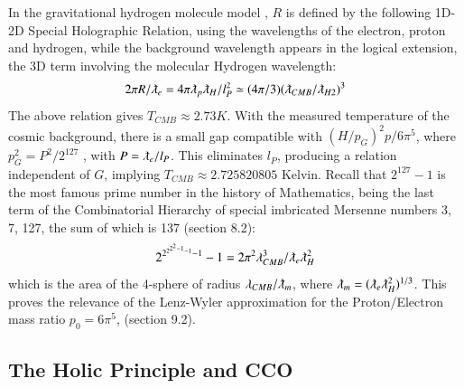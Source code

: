 \documentclass[twoside,draft]{article}
\begin{document}
\begin{sloppypar}
In the gravitational hydrogen molecule model \cite{Sanchez1}, $R$ is defined by the following 1D-2D Special
Holographic Relation, using the wavelengths of the electron, proton and hydrogen, while the background wavelength appears in the logical extension, the 3D term involving the molecular Hydrogen wavelength:
\begin{equation}
2 \pi R/\lambdabar_{e} = 4 \pi \lambdabar_{p} \lambdabar_{H} /l_{P}^2 \simeq (4\pi/3)(\lambdabar_{CMB} /\lambdabar_{H2})^{3}
\end{equation}
The above relation gives $T_{CMB} \approx 2.73 K$. With the measured temperature of the cosmic
background, there is a small gap compatible with $(H/p_G)^2 p/6\pi^5 $, where $p_{G}^{2} = P^{2} /2^{127}$ , with $P = \lambdabar_{e} /l_{P}$. 
This eliminates $l_{P}$, producing a relation independent of $G$, implying $T_{CMB} \approx 2.725820805$ Kelvin. Recall
that $2^{127} - 1$ is the most famous prime number in the history of Mathematics, being the last term of
the Combinatorial Hierarchy \cite{Sanchez1} of special imbricated Mersenne numbers 3, 7, 127, the sum of which is 137 (section 8.2):
\begin{equation}
2^{2^{{2^{2^2 - 1}-1}}-1}-1 = 2\pi^{2} \lambda_{CMB}^{3} /\lambdabar_{e} \lambdabar_{H}^2   
\end{equation}
which is the area of the 4-sphere of radius $\lambda_{CMB} / \lambdabar_{m}$, where $\lambdabar_{m} = (\lambdabar_{e} \lambdabar_{H}^2)^{1/3} $. This proves the relevance of
the Lenz-Wyler approximation for the Proton/Electron mass ratio $p_0 = 6\pi^{5}$, (section 9.2). 

\subsection{The Holic Principle and CCO}


\end{sloppypar}
\end{document}
